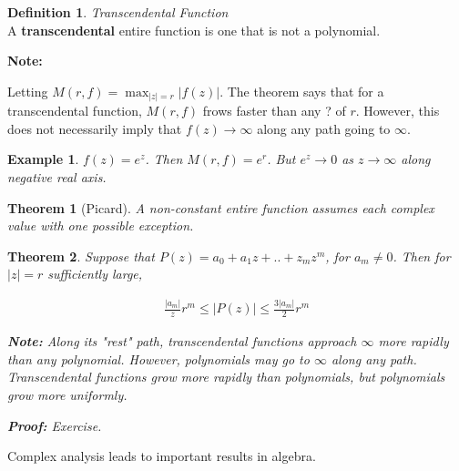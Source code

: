 \documentclass{article}
\newtheorem{theorem}{Theorem}[section]
\newtheorem{ex}{Example}
\theoremstyle{definition}
\newtheorem{definition}{Definition}[section]
\newcommand{\Def}[2]{
\begin{shaded*}
\begin{definition}{\textit{#1}}\\#2\end{definition}
\end{shaded*}
}
\begin{document}
\Def{Transcendental Function}{A \textbf{transcendental} entire function is one that is not a polynomial. }

\textbf{Note:}

Letting $M(r,f) = \max_{|z|=r} |f(z)|$. The theorem says that for a transcendental function, $M(r,f)$ frows faster than any ? of $r$. However, this does not necessarily imply that $f(z) \to \infty$ along any path going to $\infty$. 

\begin{ex}
$f(z) = e^z$. Then $M(r,f) = e^r$. But $e^z \to 0$ as $z \to \infty$ along negative real axis. 
\end{ex}

\begin{theorem}[Picard]
A non-constant entire function assumes each complex value with one possible exception.
\end{theorem}

\begin{theorem}
Suppose that $P(z) = a_0 + a_1 z + .. + z_m z^m$, for $a_m \neq 0$. Then for $|z| = r$ sufficiently large, 

\begin{align*}
\frac{|a_m|}{z} r^m \leq |P(z)| \leq \frac{3 |a_m|}{2} r^m
\end{align*}

\textbf{Note:}
Along its "rest" path, transcendental functions approach $\infty$ more rapidly than any polynomial. However, polynomials may go to $\infty$ along any path. Transcendental functions grow more rapidly than polynomials, but polynomials grow more uniformly. 

\textbf{Proof:} Exercise.
\end{theorem}

Complex analysis leads to important results in algebra. 
\end{document}
